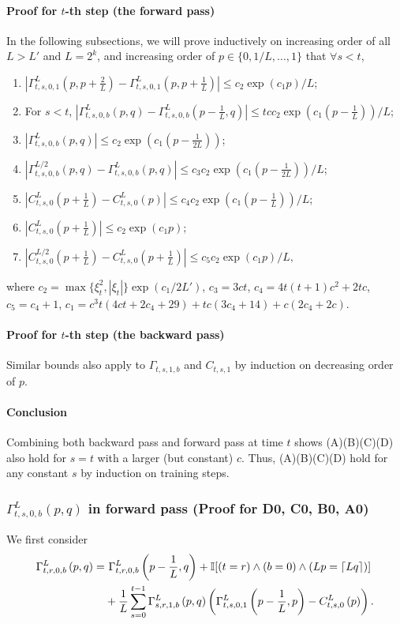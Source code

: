 \documentclass{article}
\theoremstyle{plain}
\theoremstyle{definition}
\begin{document}
\paragraph{Proof for $t$-th step (the forward pass)}
In the following subsections, we will prove inductively on increasing order of all $L > L'$ and $L=2^k$, and increasing order of $p\in \{0, 1/L, \ldots, 1\}$ that $\forall s< t$, 
\begin{enumerate}
    \item[(D0)] $|\Gamma^L_{t,s,0,1}(p,p+\frac2L)-\Gamma^L_{t,s,0,1}(p,p+\frac1L)|\leq c_2\exp(c_1 p)/L$;
    \item[(C0)] For $s < t$,
    $|\Gamma^{L}_{t,s,0,b}(p,q) - \Gamma^{L}_{t,s,0,b}(p-\frac1L,q) |\leq tcc_2 \exp(c_1 (p-\frac1L)) / L$;
    \item[(B0)] $|\Gamma^{L}_{t,s,0,b}(p,q)|\leq c_2 \exp(c_1 (p-\frac{1}{2L}))$;
    \item[(A0)] $|\Gamma^{L/2}_{t,s,0,b}(p,q) - \Gamma^L_{t,s,0,b}(p,q)|\leq c_3c_2 \exp(c_1 (p-\frac{1}{2L})) / L$;
    \item[(C1)] $|C^{L}_{t,s,0}(p+\frac1L) - C^{L}_{t,s,0}(p)|\leq c_4  c_2\exp(c_1 (p-\frac1L))/L$;
    \item[(B1)] $|C^L_{t,s,0}(p+\frac1L)|\leq c_2 \exp(c_1 p)$;
    \item[(A1)] $|C^{L/2}_{t,s,0}(p+\frac1L) - C^L_{t,s,0}(p+\frac1L)|\leq c_5 c_2 \exp(c_1 p) / L,$
\end{enumerate}
where $c_2 =\max\{\xi_t^2 , |\xi_t|\} \exp(c_1/{2L'})$, $c_3=3ct$, $c_4=4t(t+1)c^2+2tc$, $c_5=c_4+1$, $c_1=c^3t(4ct+2c_4+29) + tc(3c_4+14)+c(2c_4+2c)$.

\paragraph{Proof for $t$-th step (the backward pass)} Similar bounds also apply to $\Gamma_{t,s,1,b}$ and $C_{t,s,1}$ by induction on decreasing order of $p$. 

\paragraph{Conclusion} Combining both backward pass and forward pass at time $t$ shows (A)(B)(C)(D) also hold for $s=t$ with a larger (but constant) $c$. Thus, (A)(B)(C)(D) hold for any constant $s$ by induction on training steps. 

\subsubsection{$\Gamma^{L}_{t,s,0,b}(p,q)$ in forward pass (Proof for D0, C0, B0, A0)}
We first consider
\begin{align*} 
     \Gamma^L_{t,r,0,b}\left(p, q\right) = &~\Gamma^L_{t,r,0,b}\left(p-\frac1L, q\right) + \mathbb{I}[(t=r) \wedge (b=0) \wedge (Lp=\lceil L q\rceil)] \\
     & + \frac1L \sum_{s=0}^{t-1} \Gamma^L_{s,r,1,b}\left(p, q\right)\left(\Gamma^L_{t,s,0,1}\left(p-\frac1L, p\right)-C^L_{t,s,0}\left(p\right)\right).
\end{align*}
\end{document}
